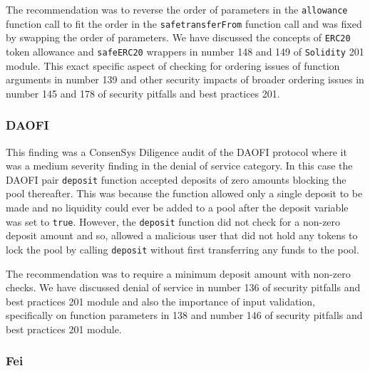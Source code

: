 The recommendation was to reverse the order of parameters in the
\texttt{allowance} function call to fit the order in the
\texttt{safetransferFrom} function call and was fixed by swapping the
order of parameters. We have discussed the concepts of \texttt{ERC20}
token allowance and \texttt{safeERC20} wrappers in number 148 and 149 of
\texttt{Solidity} 201 module. This exact specific aspect of checking for
ordering issues of function arguments in number 139 and other security
impacts of broader ordering issues in number 145 and 178 of security
pitfalls and best practices 201.

\subsubsection{DAOFI}\label{daofi}

This finding was a ConsenSys Diligence audit of the DAOFI protocol where
it was a medium severity finding in the denial of service category. In
this case the DAOFI pair \texttt{deposit} function accepted deposits of
zero amounts blocking the pool thereafter. This was because the function
allowed only a single deposit to be made and no liquidity could ever be
added to a pool after the deposit variable was set to \texttt{true}.
However, the \texttt{deposit} function did not check for a non-zero
deposit amount and so, allowed a malicious user that did not hold any
tokens to lock the pool by calling \texttt{deposit} without first
transferring any funds to the pool.

The recommendation was to require a minimum deposit amount with non-zero
checks. We have discussed denial of service in number 136 of security
pitfalls and best practices 201 module and also the importance of input
validation, specifically on function parameters in 138 and number 146 of
security pitfalls and best practices 201 module.

\subsubsection{Fei}\label{fei}

